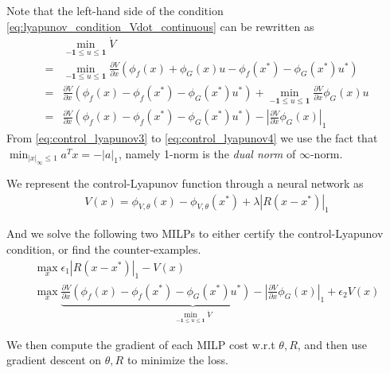 \documentclass{article}
\begin{document}
Note that the left-hand side of the condition \eqref{eq:lyapunov_condition_Vdot_continuous} can be rewritten as
\begin{subequations}
\begin{align}
	&\min_{-\mathbf{1}\le u \le \mathbf{1}} \dot{V}\\
	=&\min_{-\mathbf{1}\le u \le\mathbf{1}}\frac{\partial V}{\partial x}(\phi_f(x) + \phi_G(x)u - \phi_f(x^*) - \phi_G(x^*)u^*)\\
	=&\frac{\partial V}{\partial x}(\phi_f(x) - \phi_f(x^*) - \phi_G(x^*)u^*) + \min_{-\mathbf{1}\le u \le \mathbf{1}} \frac{\partial V}{\partial x}\phi_G(x)u\label{eq:control_lyapunov3}\\
	=&\frac{\partial V}{\partial x}(\phi_f(x) - \phi_f(x^*) - \phi_G(x^*)u^*) - \left|\frac{\partial V}{\partial x}\phi_G(x)\right|_1\label{eq:control_lyapunov4}
\end{align}
\end{subequations}
From \eqref{eq:control_lyapunov3} to \eqref{eq:control_lyapunov4} we use the fact that $\min_{|x|_{\infty}\le 1} a^Tx = -|a|_1$, namely 1-norm is the \textit{dual norm} of $\infty$-norm.

We represent the control-Lyapunov function through a neural network as
\begin{align}
	V(x) = \phi_{V, \theta}(x) - \phi_{V, \theta}(x^*) + \lambda|R(x-x^*)|_1
\end{align}

And we solve the following two MILPs to either certify the control-Lyapunov condition, or find the counter-examples.
\begin{align}
	\max_{x} \epsilon_1|R(x-x^*)|_1 - V(x)\\
	\max_{x} \underbrace{\frac{\partial V}{\partial x}(\phi_f(x) - \phi_f(x^*) - \phi_G(x^*)u^*) - \left|\frac{\partial V}{\partial x}\phi_G(x)\right|_1}_{\min_{-\mathbf{1}\le u \le \mathbf{1}} \dot{V}} + \epsilon_2V(x)
\end{align}

We then compute the gradient of each MILP cost w.r.t $\theta, R$, and then use gradient descent on $\theta, R$ to minimize the loss.
\end{document}
